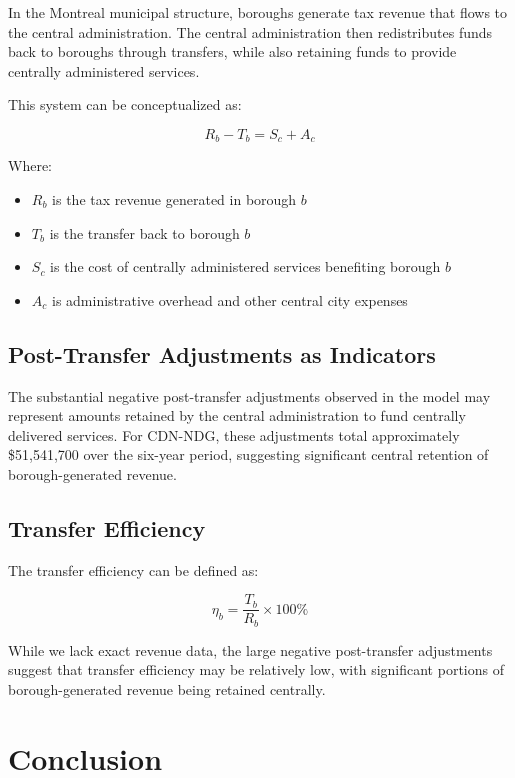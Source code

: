 \documentclass{article}
\begin{document}
In the Montreal municipal structure, boroughs generate tax revenue that flows to the central administration. The central administration then redistributes funds back to boroughs through transfers, while also retaining funds to provide centrally administered services.

This system can be conceptualized as:

\begin{equation}
R_b - T_b = S_c + A_c
\end{equation}

Where:
\begin{itemize}
    \item $R_b$ is the tax revenue generated in borough $b$
    \item $T_b$ is the transfer back to borough $b$
    \item $S_c$ is the cost of centrally administered services benefiting borough $b$
    \item $A_c$ is administrative overhead and other central city expenses
\end{itemize}

\subsection{Post-Transfer Adjustments as Indicators}

The substantial negative post-transfer adjustments observed in the model may represent amounts retained by the central administration to fund centrally delivered services. For CDN-NDG, these adjustments total approximately \$51,541,700 over the six-year period, suggesting significant central retention of borough-generated revenue.

\subsection{Transfer Efficiency}

The transfer efficiency can be defined as:

\begin{equation}
\eta_b = \frac{T_b}{R_b} \times 100\%
\end{equation}

While we lack exact revenue data, the large negative post-transfer adjustments suggest that transfer efficiency may be relatively low, with significant portions of borough-generated revenue being retained centrally.

\section{Conclusion}
\end{document}
